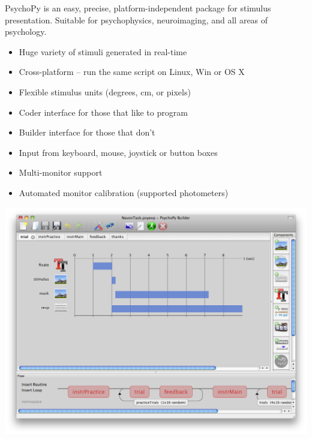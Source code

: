 \begin{multicols}{3}
PsychoPy is an easy, precise, platform-independent package for
stimulus presentation. Suitable for psychophysics, neuroimaging, and
all areas of psychology.
\begin{itemize}[nolistsep,topsep=0em,leftmargin=1pc]
\item Huge variety of stimuli generated in real-time
\item Cross-platform -- run the same script on Linux, Win or OS X
\item Flexible stimulus units (degrees, cm, or pixels)
\item Coder interface for those that like to program
\item Builder interface for those that don’t
\item Input from keyboard, mouse, joystick or button boxes
\item Multi-monitor support
\item Automated monitor calibration (supported photometers)
\end{itemize}
\includegraphics[width=\columnwidth]{../pics/psychopyBuilder.png}
\vspace{-2em}




\end{multicols}
